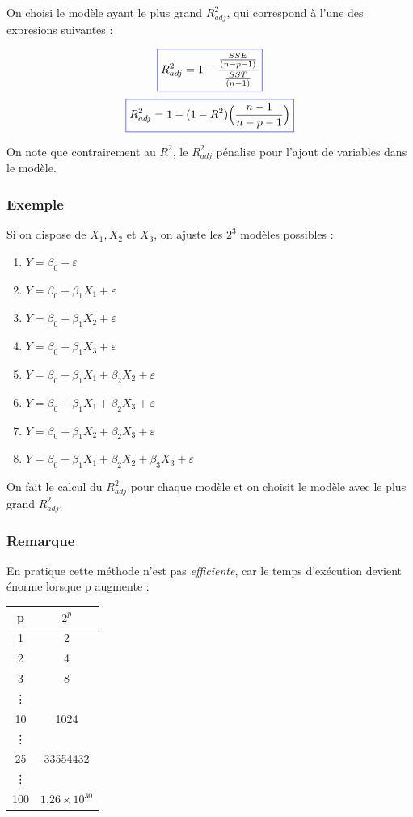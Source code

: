 \documentclass[11pt,french]{report}
\begin{document}
On choisi le modèle ayant le plus grand $R^2_{adj}$, qui correspond à l'une des expresions suivantes :

\begin{equation}
\color{blue}
\boxed{\color{black}
R^2_{adj} = 1 - \frac{\frac{SSE}{(n-p-1)}}{\frac{SST}{(n-1)}} 
}
\end{equation}
\begin{equation}
\color{blue}
\boxed{\color{black}
R^2_{adj} = 1 - (1 - R^2) \Big(\frac{n-1}{n-p-1} \Big) 
}
\end{equation}

On note que contrairement au $R^2$, le $R^2_{adj}$ pénalise pour l'ajout de variables dans le modèle.

\bigskip
\subsubsection*{Exemple}
Si on dispose de $X_1, X_2$ et $X_3$, on ajuste les $2^3$ modèles possibles :
\begin{enumerate}
\item $Y = \beta_0 + \varepsilon$
\item $Y = \beta_0 + \beta_1X_1 + \varepsilon$
\item $Y = \beta_0 + \beta_1X_2 + \varepsilon$
\item $Y = \beta_0 + \beta_1X_3 + \varepsilon$
\item $Y = \beta_0 + \beta_1X_1 + \beta_2X_2 + \varepsilon$
\item $Y = \beta_0 + \beta_1X_1 + \beta_2X_3 + \varepsilon$
\item $Y = \beta_0 + \beta_1X_2 + \beta_2X_3 + \varepsilon$
\item $Y = \beta_0 + \beta_1X_1 + \beta_2X_2 + \beta_3X_3 + \varepsilon$
\end{enumerate}
On fait le calcul du $R^2_{adj}$ pour chaque modèle et on choisit le modèle avec le plus grand $R^2_{adj}$.

\subsubsection*{Remarque}
En pratique cette méthode n'est pas \emph{efficiente}, car le temps d'exécution devient énorme lorsque p augmente :

\begin{center}
\begin{tabular}{|c|c|}
\hline
p & $2^p$ \\
\hline
1 & 2 \\
2 & 4 \\
3 & 8 \\
\vdots & \\
10 & 1024 \\
\vdots & \\
25 & 33554432 \\
\vdots & \\
100 & $1.26\times 10^{30}$ \\
\hline
\end{tabular}
\end{center}
\end{document}
